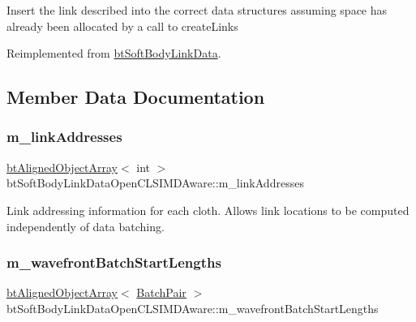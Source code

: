 Insert the link described into the correct data structures assuming space has already been allocated by a call to create\+Links 

Reimplemented from \hyperlink{classbtSoftBodyLinkData_a44f200dcb878405cebf3704dc7a8b8cd}{bt\+Soft\+Body\+Link\+Data}.



\subsection{Member Data Documentation}
\mbox{\label{classbtSoftBodyLinkDataOpenCLSIMDAware_a9e083b3c7dc8384ddbd073bff540a406}} 
\subsubsection{\texorpdfstring{m\+\_\+link\+Addresses}{m\_linkAddresses}}
{\footnotesize\ttfamily \hyperlink{classbtAlignedObjectArray}{bt\+Aligned\+Object\+Array}$<$ int $>$ bt\+Soft\+Body\+Link\+Data\+Open\+C\+L\+S\+I\+M\+D\+Aware\+::m\+\_\+link\+Addresses}

Link addressing information for each cloth. Allows link locations to be computed independently of data batching. \mbox{\label{classbtSoftBodyLinkDataOpenCLSIMDAware_a4c49f65f43a5eca3408ae17c0b3340c3}} 
\subsubsection{\texorpdfstring{m\+\_\+wavefront\+Batch\+Start\+Lengths}{m\_wavefrontBatchStartLengths}}
{\footnotesize\ttfamily \hyperlink{classbtAlignedObjectArray}{bt\+Aligned\+Object\+Array}$<$ \hyperlink{structbtSoftBodyLinkDataOpenCLSIMDAware_1_1BatchPair}{Batch\+Pair} $>$ bt\+Soft\+Body\+Link\+Data\+Open\+C\+L\+S\+I\+M\+D\+Aware\+::m\+\_\+wavefront\+Batch\+Start\+Lengths}

